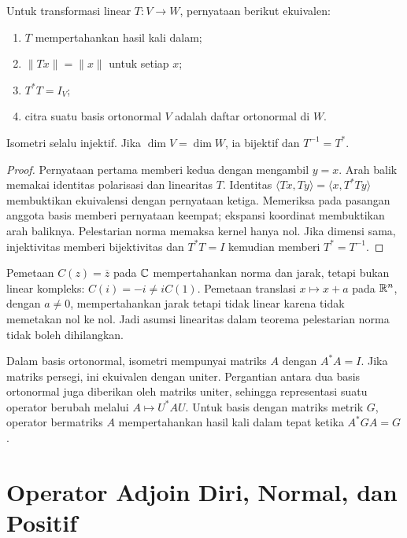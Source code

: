 \begin{teorema}
    Untuk transformasi linear $T:V\to W$, pernyataan berikut ekuivalen:
    \begin{enumerate}[label=(\roman*),nosep]
        \item $T$ mempertahankan hasil kali dalam;
        \item $\|Tx\|=\|x\|$ untuk setiap $x$;
        \item $T^*T=I_V$;
        \item citra suatu basis ortonormal $V$ adalah daftar ortonormal di $W$.
    \end{enumerate}
    Isometri selalu injektif. Jika $\dim V=\dim W$, ia bijektif
    dan $T^{-1}=T^*$.
\end{teorema}
\begin{proof}
    Pernyataan pertama memberi kedua dengan mengambil $y=x$.
    Arah balik memakai identitas polarisasi dan linearitas $T$.
    Identitas $\langle Tx,Ty\rangle=\langle x,T^*Ty\rangle$
    membuktikan ekuivalensi dengan pernyataan ketiga.
    Memeriksa pada pasangan anggota basis memberi pernyataan
    keempat; ekspansi koordinat membuktikan arah baliknya.
    Pelestarian norma memaksa kernel hanya nol.
    Jika dimensi sama, injektivitas memberi bijektivitas dan
    $T^*T=I$ kemudian memberi $T^*=T^{-1}$.
\end{proof}

\begin{exam}
    Pemetaan $C(z)=\overline z$ pada $\mathbb{C}$ mempertahankan norma
    dan jarak, tetapi bukan linear kompleks: $C(i)=-i\ne iC(1)$.
    Pemetaan translasi $x\mapsto x+a$ pada $\mathbb{R}^n$, dengan $a\ne0$,
    mempertahankan jarak tetapi tidak linear karena tidak
    memetakan nol ke nol. Jadi asumsi linearitas dalam teorema
    pelestarian norma tidak boleh dihilangkan.
\end{exam}

Dalam basis ortonormal, isometri mempunyai matriks $A$ dengan
$A^*A=I$. Jika matriks persegi, ini ekuivalen dengan uniter.
Pergantian antara dua basis ortonormal juga diberikan oleh
matriks uniter, sehingga representasi suatu operator berubah
melalui $A\mapsto U^*AU$.
Untuk basis dengan matriks metrik $G$, operator bermatriks $A$
mempertahankan hasil kali dalam tepat ketika $A^*GA=G$.

\section{Operator Adjoin Diri, Normal, dan Positif}

